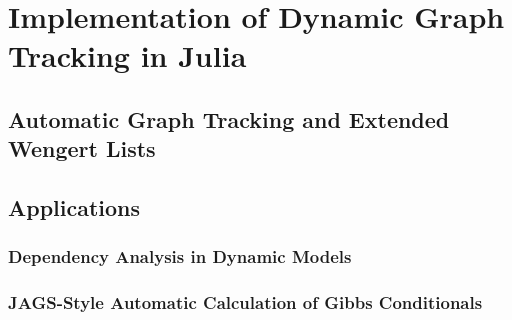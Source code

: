 \chapter{Implementation of Dynamic Graph Tracking in Julia}
\label{cha:impl-dynam-graph}


\section{Automatic Graph Tracking and Extended Wengert Lists}
\label{sec:autom-graph-track}

\section{Applications}
\label{sec:applications}

\subsection{Dependency Analysis in Dynamic Models}
\label{sec:depend-analys-dynam}


\subsection{JAGS-Style Automatic Calculation of Gibbs Conditionals}
\label{sec:jags-style-automatic}



